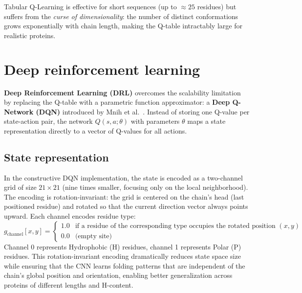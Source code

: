 Tabular Q-Learning is effective for short sequences (up to $\approx 25$ residues) but suffers from the \textit{curse of dimensionality}: the number of distinct conformations grows exponentially with chain length, making the Q-table intractably large for realistic proteins.

\section{Deep reinforcement learning}
\label{cap2:sec_drl}

\textbf{Deep Reinforcement Learning (DRL)} overcomes the scalability limitation by replacing the Q-table with a parametric function approximator: a \textbf{Deep Q-Network (DQN)} introduced by Mnih et al.~\cite{mnih2015human}. Instead of storing one Q-value per state-action pair, the network $Q(s, a; \theta)$ with parameters $\theta$ maps a state representation directly to a vector of Q-values for all actions.

\subsection{State representation}
\label{cap2:subsec_state_rep}

In the constructive DQN implementation, the state is encoded as a two-channel grid of size $21 \times 21$ (nine times smaller, focusing only on the local neighborhood). The encoding is rotation-invariant: the grid is centered on the chain's head (last positioned residue) and rotated so that the current direction vector always points upward. Each channel encodes residue type:
\begin{equation}
    g_{\text{channel}}[x, y] =
    \begin{cases}
        1.0 & \text{if a residue of the corresponding type occupies the rotated position } (x, y) \\
        0.0  & \text{(empty site)}
    \end{cases}
    \label{eq:grid_encoding_new}
\end{equation}
Channel 0 represents Hydrophobic (H) residues, channel 1 represents Polar (P) residues. This rotation-invariant encoding dramatically reduces state space size while ensuring that the CNN learns folding patterns that are independent of the chain's global position and orientation, enabling better generalization across proteins of different lengths and H-content.

